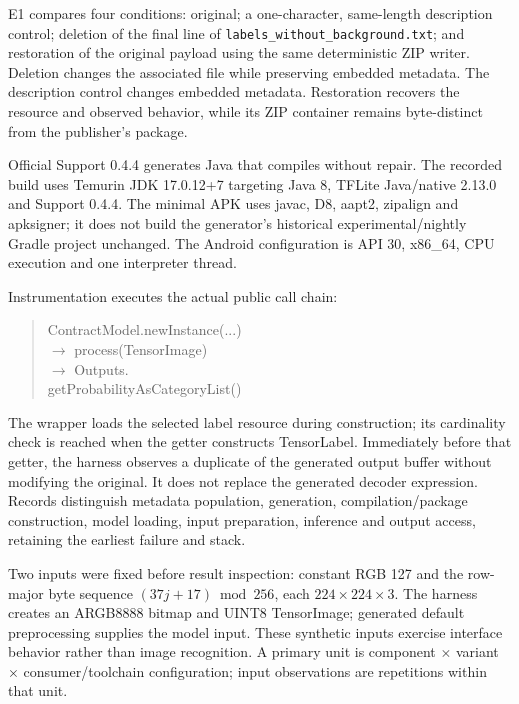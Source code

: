 \documentclass[10pt,conference]{IEEEtran}
\newcommand{\code}[1]{\texttt{#1}}
\begin{document}
E1 compares four conditions: original; a one-character, same-length description control; deletion of the final line of \code{labels\_without\_background.txt}; and restoration of the original payload using the same deterministic ZIP writer. Deletion changes the associated file while preserving embedded metadata. The description control changes embedded metadata. Restoration recovers the resource and observed behavior, while its ZIP container remains byte-distinct from the publisher's package.

Official Support 0.4.4 generates Java that compiles without repair. The recorded build uses Temurin JDK 17.0.12+7 targeting Java 8, TFLite Java/native 2.13.0 and Support 0.4.4. The minimal APK uses javac, D8, aapt2, zipalign and apksigner; it does not build the generator's historical experimental/nightly Gradle project unchanged. The Android configuration is API 30, x86\_64, CPU execution and one interpreter thread.

Instrumentation executes the actual public call chain:
\begin{quote}\small\ttfamily\raggedright
ContractModel.newInstance(...)\\
\quad\(\rightarrow\) process(TensorImage)\\
\quad\(\rightarrow\) Outputs.\\
\hspace*{1.4em}getProbabilityAsCategoryList()
\end{quote}
The wrapper loads the selected label resource during construction; its cardinality check is reached when the getter constructs TensorLabel. Immediately before that getter, the harness observes a duplicate of the generated output buffer without modifying the original. It does not replace the generated decoder expression. Records distinguish metadata population, generation, compilation/package construction, model loading, input preparation, inference and output access, retaining the earliest failure and stack.

Two inputs were fixed before result inspection: constant RGB 127 and the row-major byte sequence $(37j+17)\bmod256$, each $224\times224\times3$. The harness creates an ARGB8888 bitmap and UINT8 TensorImage; generated default preprocessing supplies the model input. These synthetic inputs exercise interface behavior rather than image recognition. A primary unit is component $\times$ variant $\times$ consumer/toolchain configuration; input observations are repetitions within that unit.
\end{document}
